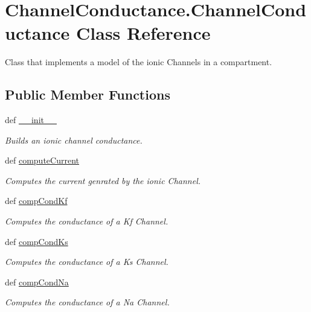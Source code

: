 \hypertarget{class_channel_conductance_1_1_channel_conductance}{\section{Channel\-Conductance.\-Channel\-Conductance Class Reference}
\label{class_channel_conductance_1_1_channel_conductance}
}


Class that implements a model of the ionic Channels in a compartment.  


\subsection*{Public Member Functions}
\begin{DoxyCompactItemize}
\item 
def \hyperlink{class_channel_conductance_1_1_channel_conductance_adaaf5ea399963a716dc532a060964348}{\-\_\-\-\_\-init\-\_\-\-\_\-}
\begin{DoxyCompactList}\small\item\em Builds an ionic channel conductance. \end{DoxyCompactList}\item 
def \hyperlink{class_channel_conductance_1_1_channel_conductance_abde599b9096579b94d24295678f45b6d}{compute\-Current}
\begin{DoxyCompactList}\small\item\em Computes the current genrated by the ionic Channel. \end{DoxyCompactList}\item 
def \hyperlink{class_channel_conductance_1_1_channel_conductance_a956928953c88e1c03c113fc98ec42cc6}{comp\-Cond\-Kf}
\begin{DoxyCompactList}\small\item\em Computes the conductance of a Kf Channel. \end{DoxyCompactList}\item 
def \hyperlink{class_channel_conductance_1_1_channel_conductance_a19cc2a71f96187c7c647855d586cecaa}{comp\-Cond\-Ks}
\begin{DoxyCompactList}\small\item\em Computes the conductance of a Ks Channel. \end{DoxyCompactList}\item 
def \hyperlink{class_channel_conductance_1_1_channel_conductance_a26e6cf970cc7a8732f590dceb1d7c993}{comp\-Cond\-Na}
\begin{DoxyCompactList}\small\item\em Computes the conductance of a Na Channel. \end{DoxyCompactList}\end{DoxyCompactItemize}
